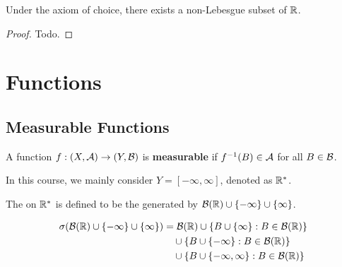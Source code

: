 \documentclass[11pt]{article}
\begin{document}
	\begin{theorem}
		Under the axiom of choice, there exists a non-Lebesgue subset of $\mathbb{R}$.
	\end{theorem}
	
	\begin{proof}
		Todo.
	\end{proof}

	\section{Functions}
	\subsection{Measurable Functions}
	\begin{definition}
		A function $f: (X, \mathcal{{A}}) \to (Y, \mathcal{{B}})$ is \textbf{measurable} if $f^{-1}(B) \in \mathcal{{A}}$ for all $B \in \mathcal{{B}}$.
	\end{definition}
	In this course, we mainly consider $Y = [-\infty, \infty]$, denoted as $\mathbb{R}^*$.
	\begin{definition}
		The \salg on $\mathbb{R}^*$ is defined to be the \salg generated by $\mathcal{{B}}(\mathbb{R}) \cup \{-\infty\} \cup \{\infty\}$.
	\end{definition}
	
	\begin{proposition}
		\begin{align}
			\sigma(\mathcal{{B}}(\mathbb{R}) \cup \{-\infty\} \cup \{\infty\}) &= \mathcal{{B}}(\mathbb{R}) \cup \{B \cup \{\infty\}: B \in \mathcal{{B}}(\mathbb{R})\} \\
			&\quad \cup \{B \cup \{-\infty\}: B \in \mathcal{{B}}(\mathbb{R})\} \\
			&\quad \cup \{B \cup \{-\infty, \infty\}: B \in \mathcal{{B}}(\mathbb{R})\}
		\end{align}
	\end{proposition}
	
\end{document}
